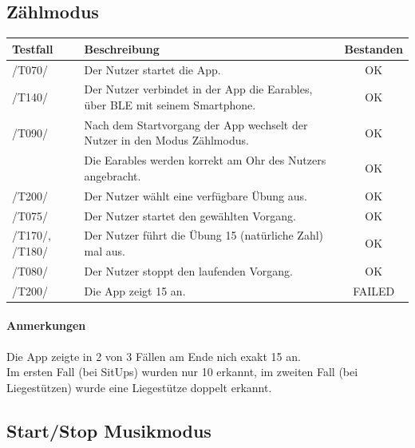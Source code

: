 \documentclass[a4paper,12pt]{article}
\newcommand{\testok}[0]{
	\cellcolor{green!25} OK
}
\newcommand{\testfailed}[0]{
	\cellcolor{red!25} FAILED
}
\begin{document}
\subsection{Zählmodus}
\begin{tabular}{ |p{1.5cm} | p{12cm} | c| }
	\hline
	\textbf{Testfall} & \textbf{Beschreibung} & \textbf{Bestanden}\\
	\hline
	/T070/ & Der Nutzer startet die App. & \testok \\
	\hline
	/T140/ & Der Nutzer verbindet in der App die Earables, über BLE mit seinem Smartphone. & \testok \\
	\hline
	/T090/ & Nach dem Startvorgang der App wechselt der Nutzer in den Modus \glqq Zählmodus\grqq . & \testok \\
	\hline
	& Die Earables werden korrekt am Ohr des Nutzers angebracht. & \testok  \\
	\hline
	/T200/ & Der Nutzer wählt eine verfügbare Übung aus. & \testok  \\
	\hline
	/T075/ & Der Nutzer startet den gewählten Vorgang. & \testok  \\
	\hline
	/T170/, /T180/ & Der Nutzer führt die Übung 15 (natürliche Zahl) mal aus. & \testok  \\
	\hline
	/T080/ & Der Nutzer stoppt den laufenden Vorgang. & \testok  \\
	\hline
	/T200/ & Die App zeigt 15 an. & \testfailed  \\
	\hline
\end{tabular}
\paragraph{Anmerkungen}
Die App zeigte in 2 von 3 Fällen am Ende nich exakt 15 an.\\
Im ersten Fall (bei SitUps) wurden nur 10 erkannt, im zweiten Fall (bei Liegestützen) wurde eine Liegestütze doppelt erkannt. 
\clearpage
\subsection{Start/Stop Musikmodus}
\end{document}
